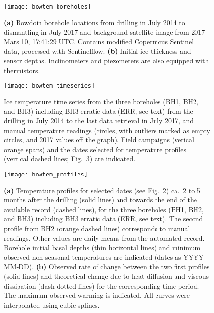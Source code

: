 \documentclass[utf8]{article}
\begin{document}
    \begin{figure}
      \centerline{\texttt{[image: bowtem\_boreholes]}}
      \caption{%
        \textbf{(a)} Bowdoin borehole locations from drilling in July 2014 to
          dismantling in July 2017 and background satellite image from 2017
          Mars 10, 17:41:29 UTC. Contains modified Copernicus Sentinel data,
          processed with Sentinelflow.
        \textbf{(b)} Initial ice thickness and sensor depths. Inclinometers
          and piezometers are also equipped with thermistors.}
      \label{fig:boreholes}
    \end{figure}

    \begin{figure}
      \centerline{\texttt{[image: bowtem\_timeseries]}}
      \caption{%
        Ice temperature time series from the three boreholes (BH1, BH2, and
        BH3) including BH3 erratic data (ERR, see text) from the drilling in
        July 2014 to the last data retrieval in July 2017, and manual
        temperature readings (circles, with outliers marked as empty circles,
        and 2017 values off the graph). Field campaigns (verical orange spans)
        and the dates selected for temperature profiles (vertical dashed lines;
        Fig.~\ref{fig:profiles}) are indicated.}
      \label{fig:timeseries}
    \end{figure}

    \begin{figure}
      \centerline{\texttt{[image: bowtem\_profiles]}}
      \caption{%
        \textbf{(a)} Temperature profiles for selected dates
          (see Fig.~\ref{fig:timeseries}) ca.~2 to 5 months after the drilling
          (solid lines) and towards the end of the available record (dashed
          lines), for the three boreholes (BH1, BH2, and BH3) including BH3
          erratic data (ERR, see text). The second profile from BH2 (orange
          dashed lines) corresponds to manual readings. Other values are daily
          means from the automated record. Borehole initial basal depths (thin
          horizontal lines) and minimum observed non-seasonal temperatures are
          indicated (dates as YYYY-MM-DD).
        \textbf{(b)} Observed rate of change between the two first profiles
          (solid lines) and theoretical change due to heat diffusion and
          viscous dissipation (dash-dotted lines) for the corresponding time
          period. The maximum observed warming is indicated. All curves were
          interpolated using cubic splines.}
      \label{fig:profiles}
    \end{figure}
\end{document}
